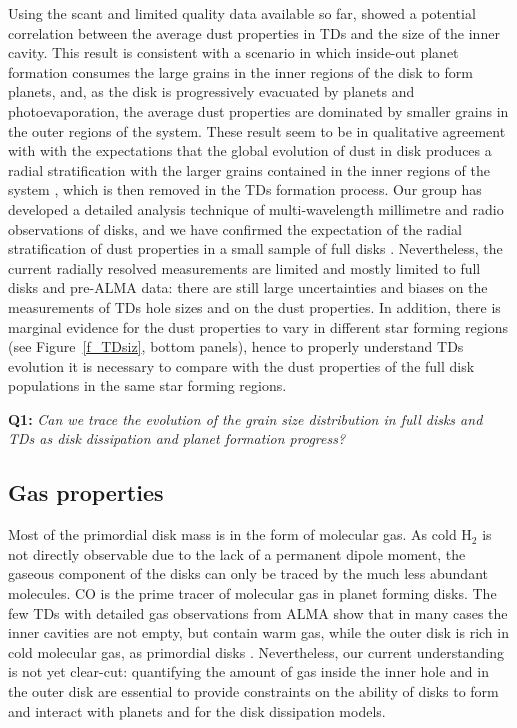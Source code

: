 \documentclass[10pt,fleqn,twoside]{article}
\begin{document}
Using the scant and limited quality data available so far, \citet{2014A&A...564A..51P} showed a potential correlation between the average dust properties in TDs and the size of the inner cavity. This result is consistent with a scenario in which inside-out planet formation consumes the large grains in the inner regions of the disk to form planets, and, as the disk is progressively evacuated by planets and photoevaporation, the average dust properties are dominated by smaller grains in the outer regions of the system. These result seem to be in qualitative agreement with with the expectations that the global evolution of dust in disk produces a radial stratification with the larger grains contained in the inner regions of the system \citep{2011A&A...525A..11B,2010A&A...513A..79B}, which is then removed in the TDs formation process. Our group has developed a detailed analysis technique of multi-wavelength millimetre and radio observations of disks, and we have confirmed the expectation of the radial stratification of dust properties in a small sample of full disks \citep{2012ApJ...760L..17P,2015ApJ...813...41P,2016A&A...588A.112G,2016A&A...588A..53T}. 
Nevertheless, the current radially resolved measurements are limited and mostly limited to full disks and pre-ALMA data: there are still large uncertainties and biases on the measurements of TDs hole sizes and on the dust properties. In addition, there is marginal evidence for the dust properties to vary in different star forming regions (see Figure~\ref{f_TDsiz}, bottom panels), hence to properly understand TDs  evolution it is necessary to compare with the dust properties of the full disk populations in the same star forming regions.

\smallskip
{\bf Q1:} {\it Can we trace the evolution of the grain size distribution in full disks and TDs as disk dissipation and planet formation progress?}

\subsection{Gas properties}
Most of the primordial disk mass is in the form of molecular gas. As cold H$_2$ is not directly observable due to the lack of a permanent dipole moment, the gaseous component of the disks can only be traced by the much less abundant molecules. CO is the prime tracer of molecular gas in planet forming disks. The few TDs with detailed gas observations from ALMA show that in many cases the inner cavities are not empty, but contain warm gas, while the outer disk is rich in cold molecular gas, as primordial disks \citep{2015A&A...579A.106V}. Nevertheless, our current understanding is not yet clear-cut: quantifying the amount of gas inside the inner hole and in the outer disk are essential to provide constraints on the ability of disks to form and interact with planets and for the disk dissipation models.
\end{document}
